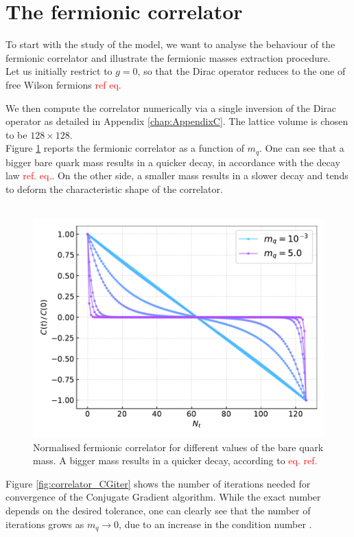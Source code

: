 \section{The fermionic correlator}
To start with the study of the model, we want to analyse the behaviour of the fermionic correlator and illustrate the fermionic masses extraction procedure. \\
Let us initially restrict to $g = 0$, so that the Dirac operator reduces to the one of free Wilson fermions \textcolor{red}{ref eq.}
\raggedright We then compute the correlator numerically via a single inversion of the Dirac operator as detailed in Appendix \ref{chap:AppendixC}. The lattice volume is chosen to be $128 \times 128$. \\
Figure \ref{fig:correlator_mass} reports the fermionic correlator as a function of $m_q$. One can see that a bigger bare quark mass results in a quicker decay, in accordance with the decay law \textcolor{red}{ref. eq.}. On the other side, a smaller mass results in a slower decay and tends to deform the characteristic shape of the correlator. \\~\\
\begin{figure}[h]
    \centering 
    \includegraphics[scale=0.6]{figures/correlator/correlator.pdf}
    \caption[Fermionic correlator]{Normalised fermionic correlator for different values of the bare quark mass. A bigger mass results in a quicker decay, according to \textcolor{red}{eq. ref.}}
    \label{fig:correlator_mass}
\end{figure}
Figure \ref{fig:correlator_CGiter} shows the number of iterations needed for convergence of the Conjugate Gradient algorithm. While the exact number depends on the desired tolerance, one can clearly see that the number of iterations grows as $m_q \to 0$, due to an increase in the condition number \cite{cond_num_ref}. \\
